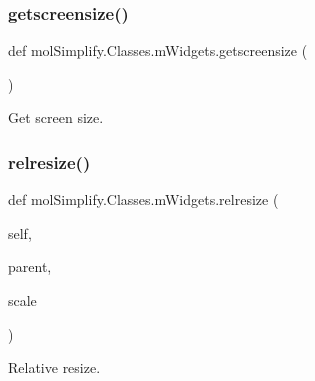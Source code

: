 \subsubsection{\texorpdfstring{getscreensize()}{getscreensize()}}
{\footnotesize\ttfamily def mol\+Simplify.\+Classes.\+m\+Widgets.\+getscreensize (\begin{DoxyParamCaption}{ }\end{DoxyParamCaption})}



Get screen size. 

\mbox{\label{namespacemolSimplify_1_1Classes_1_1mWidgets_a0c667e8ee9701b4fd0da324bbe4b0c7f}} 
\subsubsection{\texorpdfstring{relresize()}{relresize()}}
{\footnotesize\ttfamily def mol\+Simplify.\+Classes.\+m\+Widgets.\+relresize (\begin{DoxyParamCaption}\item[{}]{self,  }\item[{}]{parent,  }\item[{}]{scale }\end{DoxyParamCaption})}



Relative resize. 

